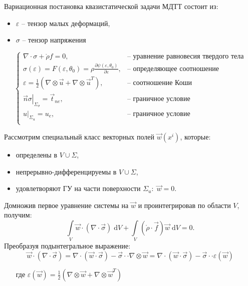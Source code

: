 
Вариационная постановка квазистатической задачи МДТТ состоит из:
\begin{itemize}
	\item $\varepsilon$ -- тензор малых деформаций,
	\item $\sigma$ -- тензор напряжения
\end{itemize}

\[
\begin{cases}
	\nabla\cdot\sigma+\mathring{\rho}f = 0, &\text{-- уравнение равновесия твердого тела}\\
	\sigma(\varepsilon) = F(\varepsilon,\theta_0)=\rho\frac{\partial\psi(\varepsilon,\theta_0)}{\partial\varepsilon},&\text{-- определяющее соотношение}\\
	\varepsilon=\frac{1}{2}(\nabla\otimes\vec{u}+\nabla\otimes\vec{u}^T),&\text{-- соотношение Коши}\\
	\left. \vec{n}\sigma\right|_{\Sigma_\sigma} = \vec{t}_{ne}, &\text{-- граничное условие}\\
	\left. u\right|_{\Sigma_u} = u_e, &\text{-- граничное условие}\\
\end{cases}
\]

Рассмотрим специальный класс векторных полей $\vec{w}\left(x^i\right)$, которые:
\begin{itemize}
	\item определены в $V\cup\Sigma$,
	\item непрерывно-дифференцируемы в $V\cup\Sigma$,
	\item удовлетворяют ГУ на части поверхности $\Sigma_u:\;\vec{w}=0$.
\end{itemize}

Домножив первое уравнение системы на $\vec{w}$ и проинтегрировав по области $V$, получим:
\[
	\int\limits_V \vec{w}\cdot\left(\nabla\cdot\vec{\sigma}\right)\;\mathrm{d}V +
	\int\limits_V \left(\mathring{\rho}\cdot\vec{f}\right)\vec{w}\;\mathrm{d}V = 0.
\]
Преобразуя подынтегральное выражение:
\[
	\vec{w}\cdot\left(\nabla\cdot\vec{\sigma}\right) = \nabla\cdot\left(\vec{w}\cdot\vec{\sigma}\right) - \vec{\sigma}\cdot\cdot\nabla\otimes\vec{w} = \nabla\cdot\left(\vec{w}\cdot\vec{\sigma}\right) - \vec{\sigma}\cdot\cdot\varepsilon(\vec{w})
\]
\begin{itemize}
	\item[где] $\varepsilon(\vec{w}) = \frac{1}{2}\left(\nabla\otimes\vec{w}+\nabla\otimes\vec{w}^T\right)$
\end{itemize}

